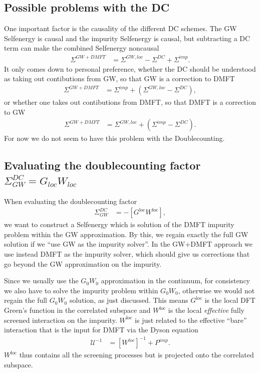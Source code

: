 \documentclass[12pt,a4paper]{scrartcl}
\numberwithin{equation}{section}
\begin{document}
\subsection{Possible problems with the DC}
One important factor is the causality of the different DC schemes.
The GW Selfenergy is causal and the impurity Selfenergy is causal,
but subtracting a DC term can make the combined Selfenergy noncausal
\begin{align}
\Sigma^{GW+DMFT} &= \Sigma^{GW,loc} - \Sigma^{DC} + \Sigma^{imp}.
\end{align}
It only comes down to personal preference, whether the DC should be understood
as taking out contibutions from GW, so that GW is a correction to DMFT
\begin{align}
\Sigma^{GW+DMFT} &=  \Sigma^{imp} + \left(\Sigma^{GW,loc} - \Sigma^{DC}\right) ,
\end{align}
or whether one takes out contibutions from DMFT, so that DMFT is a correction to GW
\begin{align}
\Sigma^{GW+DMFT} &=  \Sigma^{GW,loc} + \left(\Sigma^{imp} - \Sigma^{DC}\right) .
\end{align}
For now we do not seem to have this problem with the Doublecounting.


\subsection{Evaluating the doublecounting factor $\Sigma^{DC}_{GW}=G_{loc}W_{loc}$}
\label{sec:glocwloc_dc_factor}
When evaluating the doublecounting factor 
\begin{align}
\Sigma^{DC}_{GW} &= -[G^{\mathrm{loc}}W^{\mathrm{loc}}],
\end{align}
we want to construct a Selfenergy which is solution
of the DMFT impurity problem within the GW approximation. 
By this, we regain exactly the full GW solution if we ``use GW
as the impurity solver''. In the GW+DMFT approach we use instead
DMFT as the impurity solver, which should give us corrections
that go beyond the GW approximation on the impurity.

Since we usually use the $G_0W_0$ approximation in the continuum,
for consistency we also have to solve the impurity problem within $G_0W_0$,
otherwise we would not regain the full $G_0W_0$ solution, as just discussed.
This means $G^{\mathrm{loc}}$ is the local DFT Green's function
in the correlated subspace and $W^{\mathrm{loc}}$ is the local 
\textit{effective} fully screened interaction on the impurity.
$W^{\mathrm{loc}}$ is just related to the effective ``bare'' interaction
that is the input for DMFT via the Dyson equation
\begin{align}
\mathcal{U}^{-1} &= [W^{loc} ]^{-1} + P^{imp}.
\end{align}
$W^{\mathrm{loc}}$ thus contains all the screening processes 
but is projected onto the correlated subspace.
\end{document}
